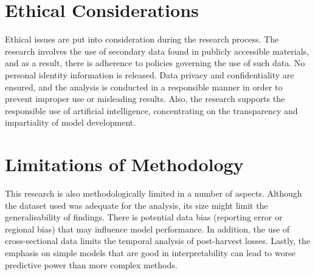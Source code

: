 \section{Ethical Considerations}

Ethical issues are put into consideration during the research process. The research involves the
use of secondary data found in publicly accessible materials, and as a result, there is adherence
to policies governing the use of such data. No personal identity information is released. Data
privacy and confidentiality are ensured, and the analysis is conducted in a responsible manner in
order to prevent improper use or misleading results. Also, the research supports the responsible
use of artificial intelligence, concentrating on the transparency and impartiality of model
development.


\section{Limitations of Methodology}

This research is also methodologically limited in a number of aspects. Although the dataset used
was adequate for the analysis, its size might limit the generalisability of findings. There is
potential data bias (reporting error or regional bias) that may influence model performance. In
addition, the use of cross-sectional data limits the temporal analysis of post-harvest losses.
Lastly, the emphasis on simple models that are good in interpretability can lead to worse
predictive power than more complex methods.
